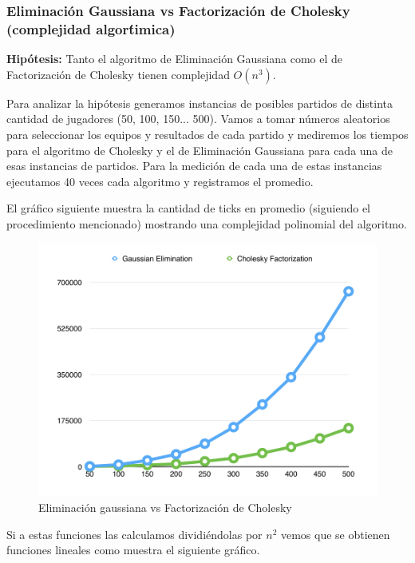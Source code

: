 \subsubsection{Eliminaci\'on Gaussiana vs Factorizaci\'on de Cholesky (complejidad algor\'timica)}

\textbf{Hip\'otesis:} Tanto el algoritmo de Eliminaci\'on Gaussiana como el de Factorizaci\'on de Cholesky tienen complejidad $O(n^{3})$.


Para analizar la hip\'otesis generamos instancias de posibles partidos de distinta cantidad de jugadores (50, 100, 150... 500). Vamos a tomar n\'umeros aleatorios para seleccionar los equipos y resultados de cada partido y mediremos los tiempos para el algoritmo de Cholesky y el de Eliminaci\'on Gaussiana para cada una de esas instancias de partidos. Para la medici\'on de cada una de estas instancias ejecutamos 40 veces cada algoritmo y registramos el promedio.

El gr\'afico siguiente muestra la cantidad de ticks en promedio (siguiendo el procedimiento mencionado) mostrando una complejidad polinomial del algoritmo.


\begin{figure}[h!]
  \begin{center}
	\includegraphics[scale=0.50]{imagenes/cuantitative/default/default1.png}
	\caption{Eliminaci\'on gaussiana vs Factorizaci\'on de Cholesky}
	\label{bChange}
  \end{center}
\end{figure}

Si a estas funciones las calculamos dividi\'endolas por $n^{2}$ vemos que se obtienen funciones lineales como muestra el siguiente gr\'afico.

